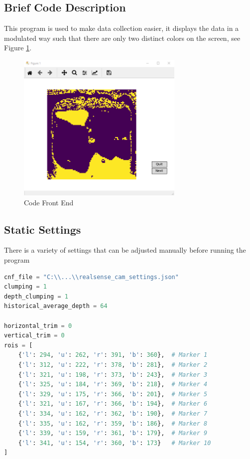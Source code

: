 \documentclass{article}
\begin{document}
			\newpage
			\subsection{Brief Code Description}
				This program is used to make data collection easier, it displays the data in a modulated way such that there are only two distinct colors on the screen, see Figure \ref{fig:codefrontexample}.
				
				\begin{figure}[h]
					\includegraphics[width=8cm]{./images/code_display_example.png}
					\centering
					\caption{Code Front End}
					\label{fig:codefrontexample}
				\end{figure}
			
				\newpage
				\subsection{Static Settings}
					There is a variety of settings that can be adjusted manually before running the program
					
					\label{code:staticsettings}
					\begin{lstlisting}[language=Python]
cnf_file = "C:\\...\\realsense_cam_settings.json"
clumping = 1
depth_clumping = 1
historical_average_depth = 64

horizontal_trim = 0
vertical_trim = 0
rois = [
	{'l': 294, 'u': 262, 'r': 391, 'b': 360},  # Marker 1
	{'l': 312, 'u': 222, 'r': 378, 'b': 281},  # Marker 2
	{'l': 321, 'u': 198, 'r': 373, 'b': 243},  # Marker 3
	{'l': 325, 'u': 184, 'r': 369, 'b': 218},  # Marker 4
	{'l': 329, 'u': 175, 'r': 366, 'b': 201},  # Marker 5
	{'l': 321, 'u': 167, 'r': 366, 'b': 194},  # Marker 6
	{'l': 334, 'u': 162, 'r': 362, 'b': 190},  # Marker 7
	{'l': 335, 'u': 162, 'r': 359, 'b': 186},  # Marker 8
	{'l': 339, 'u': 159, 'r': 361, 'b': 179},  # Marker 9
	{'l': 341, 'u': 154, 'r': 360, 'b': 173}   # Marker 10
]
					\end{lstlisting}
					
\end{document}
